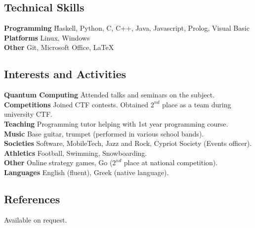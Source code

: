 \documentclass[a4paper,10pt]{article}
\begin{document}
\subsection*{Technical Skills}
\begin{tabbing}
{\bf Programming} \hspace{3pt} \= Haskell, Python, C, C++, Java, Javascript, Prolog, Visual Basic \\
{\bf Platforms} \> Linux, Windows\\
{\bf Other} \> Git, Microsoft Office, \LaTeX
\\
\end{tabbing}

\subsection*{Interests and Activities}
\begin{tabbing}
{\bf Quantum Computing} \hspace{3pt} \= Attended talks and seminars on the subject.\\
{\bf Competitions}  \> Joined CTF contests. Obtained $2^{nd}$ place as a team during university CTF.\\
{\bf Teaching}  \> Programming tutor helping with 1st year programming course.\\
{\bf Music} \> Base guitar, trumpet (performed in various school bands).\\
{\bf Societies} \> Software, MobileTech, Jazz and Rock, Cypriot Society (Events officer).\\
{\bf Athletics} \> Football, Swimming, Snowboarding.\\
{\bf Other} \> Online strategy games, Go ($2^{nd}$ place at national competition).\\
{\bf Languages} \> English (fluent), Greek (native language).\\
\end{tabbing}

\subsection*{References}
Available on request.
\end{document}
